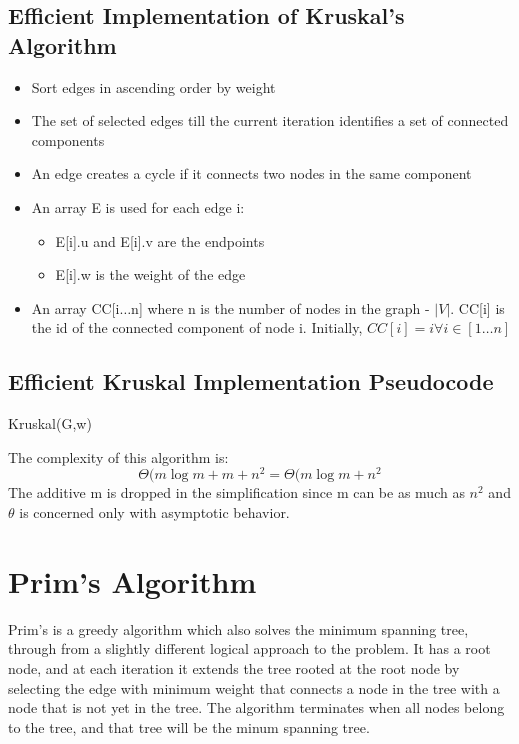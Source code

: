 \documentclass[12pt,letterpaper]{article}
\begin{document}
\subsection{Efficient Implementation of Kruskal's Algorithm}
\begin{itemize}
\item Sort edges in ascending order by weight
\item The set of selected edges till the current iteration identifies a set of connected components
\item An edge creates a cycle if it connects two nodes in the same component
\item An array E is used for each edge i:
\begin{itemize}
\item E[i].u and E[i].v are the endpoints
\item E[i].w is the weight of the edge
\end{itemize} 
\item An array CC[i$\dots$n] where n is the number of nodes in the graph - $|V|$. CC[i] is the id of the connected component of node i. Initially, $CC[i]=i\forall i\in [1\dots n]$
\end{itemize}
\subsection{Efficient Kruskal Implementation Pseudocode}
\begin{algorithm}[h]
Kruskal(G,w)
\end{algorithm}
The complexity of this algorithm is:
\[\Theta(m\log m+m+n^2=\Theta(m\log m +n^2\]
The additive m is dropped in the simplification since m can be as much as $n^2$ and $\theta$ is concerned only with asymptotic behavior.
\FloatBarrier
\section{Prim's Algorithm}
Prim's is a greedy algorithm which also solves the minimum spanning tree, through from a slightly different logical approach to the problem. It has a root node, and at each iteration it extends the tree rooted at the root node by selecting the edge with minimum weight that connects a node in the tree with a node that is not yet in the tree. The algorithm terminates when all nodes belong to the tree, and that tree will be the minum spanning tree. 
\end{document}
